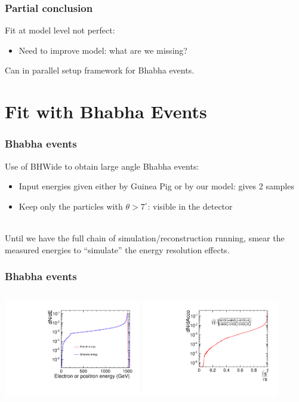 \documentclass{beamer}
\begin{document}
\begin{frame}
\frametitle{Partial conclusion}
Fit at model level not perfect:
\begin{itemize}
  \item Need to improve model: what are we missing?
\end{itemize} 
Can in parallel setup framework for Bhabha events.
\end{frame}

\section{Fit with Bhabha Events}
\begin{frame}
\frametitle{Bhabha events}
Use of BHWide to obtain large angle Bhabha events:
\begin{itemize}
  \item Input energies given either by Guinea Pig or by our model: gives 2
  samples
  \item Keep only the particles with $\theta>7^\circ$: visible in the detector
\end{itemize}
~\\
Until we have the full chain of simulation/reconstruction running, smear the
measured energies to ``simulate'' the energy resolution effects.
\end{frame}
\begin{frame}
\frametitle{Bhabha events}
\begin{columns}[c]
\column{6cm}
\includegraphics[width=6cm]{ElectronEnergyFCAL.pdf}
\column{6cm}
\includegraphics[width=6cm]{AccolinearityFCAL.pdf}
\end{columns}
\end{frame}
\end{document}
